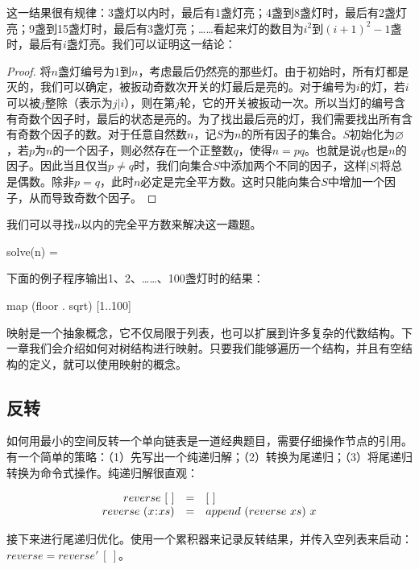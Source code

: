 \documentclass[b5paper]{ctexart}
\begin{document}
这一结果很有规律：3盏灯以内时，最后有1盏灯亮；4盏到8盏灯时，最后有2盏灯亮；9盏到15盏灯时，最后有3盏灯亮；……看起来灯的数目为$i^2$到$(i+1)^2-1$盏时，最后有$i$盏灯亮。我们可以证明这一结论：

\begin{proof}
将$n$盏灯编号为1到$n$，考虑最后仍然亮的那些灯。由于初始时，所有灯都是灭的，我们可以确定，被扳动奇数次开关的灯最后是亮的。对于编号为$i$的灯，若$i$可以被$j$整除（表示为$j | i$），则在第$j$轮，它的开关被扳动一次。所以当灯的编号含有奇数个因子时，最后的状态是亮的。为了找出最后亮的灯，我们需要找出所有含有奇数个因子的数。对于任意自然数$n$，记$S$为$n$的所有因子的集合。$S$初始化为$\varnothing$，若$p$为$n$的一个因子，则必然存在一个正整数$q$，使得$n = p q$。也就是说$q$也是$n$的因子。因此当且仅当$p \neq q$时，我们向集合$S$中添加两个不同的因子，这样$|S|$将总是偶数。除非$p = q$，此时$n$必定是完全平方数。这时只能向集合$S$中增加一个因子，从而导致奇数个因子。
\end{proof}

我们可以寻找$n$以内的完全平方数来解决这一趣题。

\be
solve(n) = \lfloor {} \rfloor
\ee

下面的例子程序输出1、2、……、100盏灯时的结果：

\begin{Haskell}
map (floor . sqrt) [1..100]
\end{Haskell}

映射是一个抽象概念，它不仅局限于列表，也可以扩展到许多复杂的代数结构。下一章我们会介绍如何对树结构进行映射。只要我们能够遍历一个结构，并且有空结构的定义，就可以使用映射的概念。

\subsection{反转}
\label{sec:revlist} 

如何用最小的空间反转一个单向链表是一道经典题目，需要仔细操作节点的引用。有一个简单的策略：（1）先写出一个纯递归解；（2）转换为尾递归；（3）将尾递归转换为命令式操作。纯递归解很直观：

\[
\begin{array}{rcl}
reverse\ [\ ] & = & [\ ] \\
reverse\ (x \mathbin{\!:\!} xs) & = & append\ (reverse\ xs)\ x \\
\end{array}
\]

接下来进行尾递归优化。使用一个累积器来记录反转结果，并传入空列表来启动：$reverse = reverse'\ [\ ]$。
\end{document}
